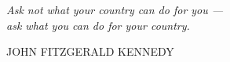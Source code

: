 {
	\null\vfill

	\newlength\longest%
	\settowidth{} %
	\centering
	\parbox{\longest}{%
		\raggedright{\LARGE\itshape%
			Ask not what your country can do for you --- \\
			ask what you can do for your country.\/\par\bigskip
		}
		\raggedleft\Large\MakeUppercase{John Fitzgerald Kennedy}\par%
	}

	\vfill\vfill
}
